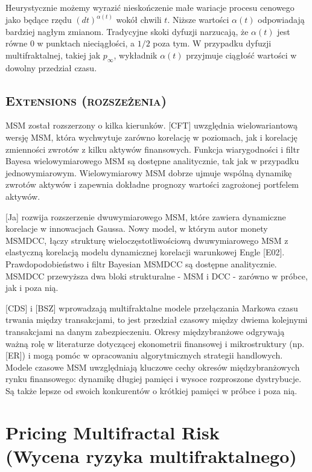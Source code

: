\documentclass[12pt]{article}
\theoremstyle{definition}
\begin{document}
Heurystycznie możemy wyrazić nieskończenie małe wariacje procesu cenowego jako będące rzędu $(dt)^{\alpha(t)}$ wokół chwili $t$. Niższe wartości $\alpha(t)$ odpowiadają bardziej nagłym zmianom. Tradycyjne skoki dyfuzji narzucają, że $\alpha(t)$ jest równe $0$ w punktach nieciągłości, a $1/2$ poza tym. W przypadku dyfuzji multifraktalnej, takiej jak $p_{\infty}$, wykładnik $\alpha(t)$ przyjmuje ciągłość wartości w dowolny przedział czasu.

\subsection{\textsc{Extensions (rozszeżenia)}}

MSM został rozszerzony o kilka kierunków. [CFT] uwzględnia wielowariantową wersję MSM, która wychwytuje zarówno korelację w poziomach, jak i korelację zmienności zwrotów z kilku aktywów finansowych. Funkcja wiarygodności i filtr Bayesa wielowymiarowego MSM są dostępne analitycznie, tak jak w przypadku jednowymiarowym. Wielowymiarowy MSM dobrze ujmuje wspólną dynamikę zwrotów aktywów i zapewnia dokładne prognozy wartości zagrożonej portfelem aktywów.

[Ja] rozwija rozszerzenie dwuwymiarowego MSM, które zawiera dynamiczne korelacje w innowacjach Gaussa. Nowy model, w którym autor monety MSMDCC, łączy strukturę wieloczęstotliwościową dwuwymiarowego MSM z elastyczną korelacją modelu dynamicznej korelacji warunkowej Engle [E02]. Prawdopodobieństwo i filtr Bayesian MSMDCC są dostępne analitycznie. MSMDCC przewyższa dwa bloki strukturalne - MSM i DCC - zarówno w próbce, jak i poza nią.

[CDS] i [BSZ] wprowadzają multifraktalne modele przełączania Markowa czasu trwania między transakcjami, to jest przedział czasowy między dwiema kolejnymi transakcjami na danym zabezpieczeniu. Okresy międzybranżowe odgrywają ważną rolę w literaturze dotyczącej ekonometrii finansowej i mikrostruktury (np. [ER]) i mogą pomóc w opracowaniu algorytmicznych strategii handlowych. Modele czasowe MSM uwzględniają kluczowe cechy okresów międzybranżowych rynku finansowego: dynamikę długiej pamięci i wysoce rozproszone dystrybucje. Są także lepsze od swoich konkurentów o krótkiej pamięci w próbce i poza nią.

\section{Pricing Multifractal Risk \\(Wycena ryzyka multifraktalnego)}
\end{document}
